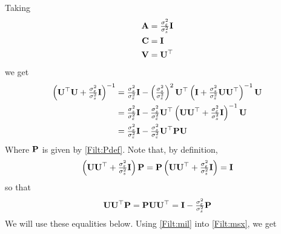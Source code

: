 Taking 
\begin{align}
{\bf A} &= \tfrac{\sigma_\varepsilon^2}{\sigma_s^2} {\mathbf I}  \\
{\bf C} &= {\mathbf I}      \\
{\bf V} &= {\mathbf U}^\top
\end{align}
we get
\begin{align}
\label{Filt:mil}
\left({\mathbf U}^\top {\mathbf U} + \tfrac{\sigma_\varepsilon^2}{\sigma_s^2}{\mathbf I} \right)^{-1} 
    &= \tfrac{\sigma_s^2}{\sigma_\varepsilon^2}{\mathbf I} 
	 - \left(\tfrac{\sigma_s^2}{\sigma_\varepsilon^2}\right)^2 {\mathbf U}^\top 
	   \left({\mathbf I} + \tfrac{\sigma_s^2}{\sigma_\varepsilon^2} {\mathbf U} {\mathbf U}^\top \right)^{-1} 
	   {\mathbf U}     \nonumber \\
    &= \tfrac{\sigma_s^2}{\sigma_\varepsilon^2}{\mathbf I} 
	 - \tfrac{\sigma_s^2}{\sigma_\varepsilon^2} {\mathbf U}^\top 
	   \left({\mathbf U} {\mathbf U}^\top + \tfrac{\sigma_\varepsilon^2}{\sigma_s^2} {\mathbf I} \right)^{-1} 
	   {\mathbf U}   \nonumber\\
    &= \tfrac{\sigma_s^2}{\sigma_\varepsilon^2}{\mathbf I} 
	 - \tfrac{\sigma_s^2}{\sigma_\varepsilon^2} {\mathbf U}^\top 
	   {\mathbf P} {\mathbf U}
\end{align}
Where ${\mathbf P}$ is given by \eqref{Filt:Pdef}. Note that, by definition,
\begin{align}
\left({\mathbf U} {\mathbf U}^\top + \tfrac{\sigma_\varepsilon^2}{\sigma_s^2} {\mathbf I} \right) {\mathbf P} 
= {\mathbf P}\left({\mathbf U} {\mathbf U}^\top + \tfrac{\sigma_\varepsilon^2}{\sigma_s^2} {\mathbf I} \right)  
= {\mathbf I} 
\end{align}
so that
\begin{align}
{\mathbf U} {\mathbf U}^\top {\mathbf P} = {\mathbf P} {\mathbf U} {\mathbf U}^\top  = {\mathbf I} - \tfrac{\sigma_\varepsilon^2}{\sigma_s^2} {\mathbf P}
\end{align}
We will use these equalities below. Using \eqref{Filt:mil} into \eqref{Filt:msx}, we get
